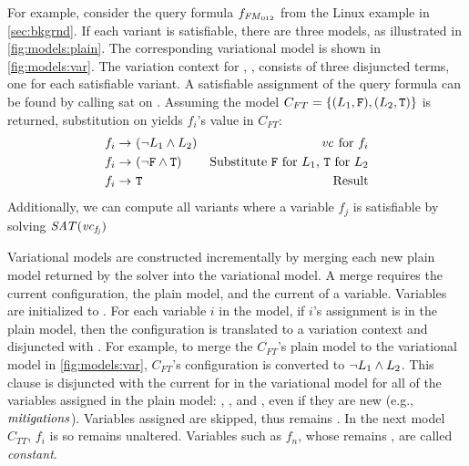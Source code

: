 For example, consider the query formula $f_{\text{\ensuremath{\mathit{FM}_{012}}}}$ from the
Linux example in \autoref{sec:bkgrnd}.
If each variant is satisfiable, there are three models, as illustrated in
\autoref{fig:models:plain}. The corresponding variational model is shown in
\autoref{fig:models:var}.
The variation context for \SatVar{}, \Satfmf{}, consists of three
disjuncted terms, one
for each satisfiable variant. A satisfiable assignment of the query
formula can be found by calling \ac{sat} on \Satfmf{}. Assuming the model $C_{FT} =
\{(L_{1}{}, \texttt{F}{}), (L_{2}{}, \texttt{T}{})\}$ is returned, substitution on
 yields $f_{i}$'s value in $C_{FT}$:
%
\begin{align*}
  f_{i} \rightarrow\ & (\neg L_{1}{} \wedge L_{2}{}) & \text{\ensuremath{\mathit{vc}_{}} for $f_{i}$} \\
  f_{i} \rightarrow\ & (\neg \texttt{F}{} \wedge \texttt{T}{}) & \text{Substitute \texttt{F}{} for \ensuremath{L_{1}}{}, \texttt{T}{} for \ensuremath{L_{2}}{}} \\
  f_{i} \rightarrow\ & \texttt{T}{} & \text{Result}
\end{align*}%
%
Additionally, we can compute all variants where a variable $f_j$ is
satisfiable by solving $\mathit{SAT(\mathit{vc}_{f_j})}$

Variational models are constructed incrementally by merging each new plain model
returned by the solver into the variational model. A merge requires the current
configuration, the plain model, and the current \vc{} of a variable. Variables are
initialized to \fls{}. For each variable $i$ in the model, if $i$'s assignment
is \tru{} in the plain model, then the configuration is translated to a
variation context and disjuncted with . For example, to merge the
$C_{FT}$'s plain model to the variational model in \autoref{fig:models:var},
$C_{FT}$'s configuration is converted to $\neg L_{1}{} \wedge L_{2}{}$. This
clause is disjuncted with the current \vc{} for in the variational model
for all of the variables assigned \tru{} in the plain model: ,
, and , even if they are new (e.g.,
$\mathit{mitigations}$). Variables assigned \fls{} are skipped, thus  remains
\fls{}. In the next model $C_{TT}$, $f_{i}$ is \fls{} so  remains
unaltered. Variables such as $f_{n}$, whose \vc{} remains \fls{}, are called
\textit{constant}.

